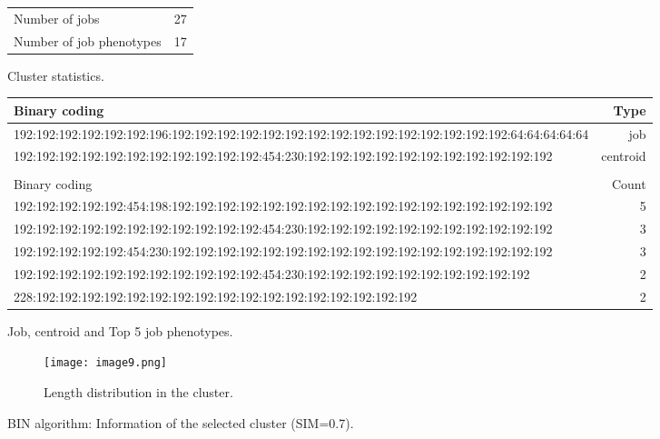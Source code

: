 \documentclass{jhps}
\begin{document}
\begin{cluster}
	\begin{subtable}{\textwidth}
		\centering
		\begin{tabular}{ll}
			Number of jobs & 27 \\
			Number of job phenotypes & 17 \\
		\end{tabular}
		\caption{Cluster statistics.}
		\label{cluster:use_case:bin_all:stats}
	\end{subtable}
	\medskip
	\begin{subtable}{\textwidth}
		\centering
		\begin{tiny}
			\begin{tabular}{l|r}
				\rowcolor{tblhead}
				Binary coding                                                                                          &  Type     \\
				\hline
				192:192:192:192:192:192:196:192:192:192:192:192:192:192:192:192:192:192:192:192:192:192:64:64:64:64:64 &  job      \\
				192:192:192:192:192:192:192:192:192:192:192:454:230:192:192:192:192:192:192:192:192:192:192:192        &  centroid \\
				\multicolumn{2}{l}{}                                                                                   \\
				\rowcolor{tblhead}
				Binary coding                                                                                          &  Count    \\
				\hline
				192:192:192:192:192:454:198:192:192:192:192:192:192:192:192:192:192:192:192:192:192:192:192:192        &  5        \\
				192:192:192:192:192:192:192:192:192:192:192:454:230:192:192:192:192:192:192:192:192:192:192:192        &  3        \\
				192:192:192:192:192:454:230:192:192:192:192:192:192:192:192:192:192:192:192:192:192:192:192:192        &  3        \\
				192:192:192:192:192:192:192:192:192:192:192:454:230:192:192:192:192:192:192:192:192:192:192            &  2        \\
				228:192:192:192:192:192:192:192:192:192:192:192:192:192:192:192:192:192                                &  2        \\
			\end{tabular}
		\end{tiny}
		\caption{Job, centroid and Top 5 job phenotypes.}
		\label{cluster:use_case:bin_all:top_jobs}
	\end{subtable}
	\medskip
	\begin{subfigure}{\textwidth}
		\centering
		\texttt{[image: image9.png]}
		\caption{Length distribution in the cluster.}
		\label{cluster:use_case:bin_all:length}
	\end{subfigure}
	\caption{BIN algorithm: Information of the selected cluster (SIM=0.7).}
	\label{cluster:use_case:bin}
\end{cluster}
\end{document}
